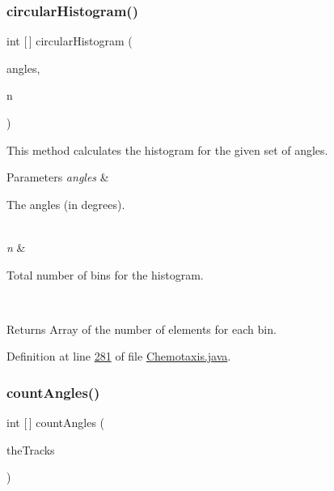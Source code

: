 \hypertarget{classanalysis_1_1_chemotaxis_a50fdf81a3460741674381622f16581cb}{}\label{classanalysis_1_1_chemotaxis_a50fdf81a3460741674381622f16581cb} 
\subsubsection{\texorpdfstring{circular\+Histogram()}{circularHistogram()}}
{\footnotesize\ttfamily int \mbox{[}$\,$\mbox{]} circular\+Histogram (\begin{DoxyParamCaption}\item[{List$<$ Double $>$}]{angles,  }\item[{int}]{n }\end{DoxyParamCaption})\hspace{0.3cm}{\ttfamily [private]}}

This method calculates the histogram for the given set of angles.


\begin{DoxyParams}{Parameters}
{\em angles} & 
\begin{DoxyItemize}
\item The angles (in degrees). 
\end{DoxyItemize}\\
\hline
{\em n} & 
\begin{DoxyItemize}
\item Total number of bins for the histogram. 
\end{DoxyItemize}\\
\hline
\end{DoxyParams}
\begin{DoxyReturn}{Returns}
Array of the number of elements for each bin. 
\end{DoxyReturn}


Definition at line \hyperlink{_chemotaxis_8java_source_l00281}{281} of file \hyperlink{_chemotaxis_8java_source}{Chemotaxis.\+java}.

\hypertarget{classanalysis_1_1_chemotaxis_a55deae924cf7ec2004a8fdcd8e185f94}{}\label{classanalysis_1_1_chemotaxis_a55deae924cf7ec2004a8fdcd8e185f94} 
\subsubsection{\texorpdfstring{count\+Angles()}{countAngles()}}
{\footnotesize\ttfamily int \mbox{[}$\,$\mbox{]} count\+Angles (\begin{DoxyParamCaption}\item[{\hyperlink{classdata_1_1_serializable_list}{Serializable\+List}}]{the\+Tracks }\end{DoxyParamCaption})\hspace{0.3cm}{\ttfamily [private]}}

